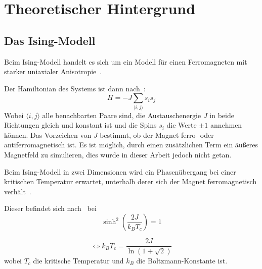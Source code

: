 \chapter{Theoretischer Hintergrund}
	\label{chap:theorie}
	
	\section{Das Ising-Modell}
	\label{sec:isingtheorie}
	Beim Ising-Modell handelt es sich um ein Modell für einen Ferromagneten mit starker uniaxialer Anisotropie~\cite[S. 7]{binderheermann}. %
	
	Der Hamiltonian des Systems ist dann nach~\cite[S. 7]{binderheermann}:
	\begin{equation}
	H=-J\sum_{\langle i,j\rangle }s_is_j
	\label{eq:hamiltonianising}
	\end{equation}
	Wobei $\langle i,j\rangle$ alle benachbarten Paare sind, die Austauschenergie $J$ in beide Richtungen gleich und konstant ist und die Spins $s_i$ die  Werte $\pm 1$ annehmen können. Das Vorzeichen von $J$ bestimmt, ob der Magnet ferro- oder antiferromagnetisch ist. Es ist möglich, durch einen zusätzlichen Term ein äußeres Magnetfeld zu simulieren, dies wurde in dieser Arbeit jedoch nicht getan.%

	
	Beim Ising-Modell in zwei Dimensionen wird ein Phasenübergang bei einer kritischen Temperatur erwartet, unterhalb derer sich der Magnet ferromagnetisch verhält~\cite[vgl. ][]{peierls_1936}.
	
	Dieser befindet sich nach~\cite{OnsagerCrystal1} bei \[\sinh^2\left(\frac{2J}{k_BT_c}\right) =1\]
	
	\begin{equation}
	\Leftrightarrow k_BT_c=\frac{2J}{\ln(1+\sqrt{2})}
	\label{eq:kritischetemperatur}
	\end{equation}
	wobei $T_c$ die kritische Temperatur und $k_B$ die Boltzmann-Konstante ist.
	
	
